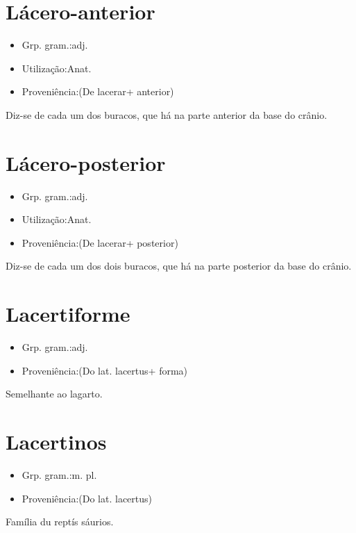 \section{Lácero-anterior}
\begin{itemize}
\item {Grp. gram.:adj.}
\end{itemize}
\begin{itemize}
\item {Utilização:Anat.}
\end{itemize}
\begin{itemize}
\item {Proveniência:(De \textunderscore lacerar\textunderscore  + \textunderscore anterior\textunderscore )}
\end{itemize}
Diz-se de cada um dos buracos, que há na parte anterior da base do crânio.
\section{Lácero-posterior}
\begin{itemize}
\item {Grp. gram.:adj.}
\end{itemize}
\begin{itemize}
\item {Utilização:Anat.}
\end{itemize}
\begin{itemize}
\item {Proveniência:(De \textunderscore lacerar\textunderscore  + \textunderscore posterior\textunderscore )}
\end{itemize}
Diz-se de cada um dos dois buracos, que há na parte posterior da base do crânio.
\section{Lacertiforme}
\begin{itemize}
\item {Grp. gram.:adj.}
\end{itemize}
\begin{itemize}
\item {Proveniência:(Do lat. \textunderscore lacertus\textunderscore  + \textunderscore forma\textunderscore )}
\end{itemize}
Semelhante ao lagarto.
\section{Lacertinos}
\begin{itemize}
\item {Grp. gram.:m. pl.}
\end{itemize}
\begin{itemize}
\item {Proveniência:(Do lat. \textunderscore lacertus\textunderscore )}
\end{itemize}
Família du reptís sáurios.
